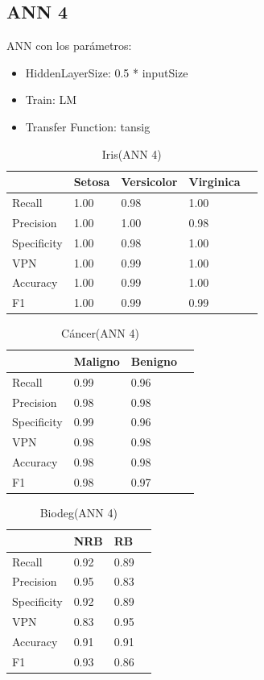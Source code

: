 \documentclass[a4paper,openwrite,12pt]{article}
\begin{document}
\subsection{ANN 4}
ANN con los parámetros:
\begin{itemize}
    \item HiddenLayerSize: 0.5 * inputSize
    \item Train: LM
    \item Transfer Function: tansig
\end{itemize}

\begin{table}[H]
\centering
\begin{tabular}{@{}lllll@{}}
\toprule
            & Setosa & Versicolor & Virginica &  \\ \midrule
Recall      & 1.00   & 0.98       & 1.00      &  \\
Precision   & 1.00   & 1.00       & 0.98      &  \\
Specificity & 1.00   & 0.98       & 1.00      &  \\
VPN         & 1.00   & 0.99       & 1.00      &  \\
Accuracy    & 1.00   & 0.99       & 1.00      &  \\
F1          & 1.00   & 0.99       & 0.99      &  \\ \bottomrule
\end{tabular}
\caption{Iris(ANN 4)}
\end{table}


\begin{table}[H]
\centering
\begin{tabular}{@{}llll@{}}
\toprule
            & Maligno & Benigno &  \\ \midrule
Recall      & 0.99    & 0.96    &  \\
Precision   & 0.98    & 0.98    &  \\
Specificity & 0.99    & 0.96    &  \\
VPN         & 0.98    & 0.98    &  \\
Accuracy    & 0.98    & 0.98    &  \\
F1          & 0.98    & 0.97    &  \\ \bottomrule
\end{tabular}
\caption{Cáncer(ANN 4)}
\end{table}

\begin{table}[H]
\centering
\begin{tabular}{@{}llll@{}}
\toprule
            & NRB &   RB &  \\ \midrule
Recall      & 0.92    & 0.89    &  \\
Precision   & 0.95    & 0.83    &  \\
Specificity & 0.92    & 0.89    &  \\
VPN         & 0.83    & 0.95    &  \\
Accuracy    & 0.91    & 0.91    &  \\
F1          & 0.93    & 0.86    &  \\ \bottomrule
\end{tabular}
\caption{Biodeg(ANN 4)}
\end{table}
\end{document}
